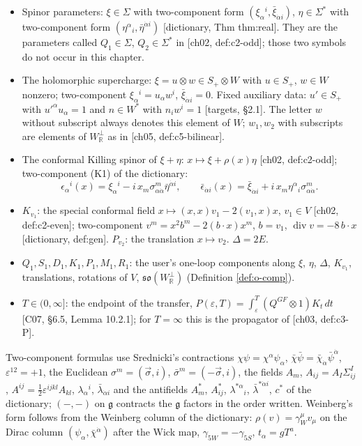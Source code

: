 \begin{definition}
\label{def:o-names}
\begin{itemize}
\item Spinor parameters: $\xi\in\Sigma$ with two-component form $(\xi_\alpha{}^i,\bar\xi_{\dot\alpha i})$, $\eta\in\Sigma^*$ with two-component form $(\eta^\alpha{}_i,\bar\eta^{\dot\alpha i})$ [dictionary, Thm thm:real]. They are the parameters called $Q_1\in\Sigma$, $Q_2\in\Sigma^*$ in [ch02, def:c2-odd]; those two symbols do not occur in this chapter.
\item The holomorphic supercharge: $\xi=u\otimes w\in S_+\otimes W$ with $u\in S_+$, $w\in W$ nonzero; two-component $\xi_\alpha{}^i=u_\alpha w^i$, $\bar\xi_{\dot\alpha i}=0$. Fixed auxiliary data: $u'\in S_+$ with $u'^\alpha u_\alpha=1$ and $n\in W^*$ with $n_iw^i=1$ [targets, §2.1]. The letter $w$ without subscript always denotes this element of $W$; $w_1,w_2$ with subscripts are elements of $W_{\mathbb R}^\perp$ as in [ch05, def:c5-bilinear].
\item The conformal Killing spinor of $\xi+\eta$: $x\mapsto\xi+\rho(x)\eta$ [ch02, def:c2-odd]; two-component (K1) of the dictionary:
\[
\epsilon_\alpha{}^i(x)=\xi_\alpha{}^i-i\,x_m\sigma^m_{\alpha\dot\alpha}\bar\eta^{\dot\alpha i},\qquad \bar\epsilon_{\dot\alpha i}(x)=\bar\xi_{\dot\alpha i}+i\,x_m\eta^\alpha{}_i\sigma^m_{\alpha\dot\alpha}.
\]
\item $K_{v_1}$: the special conformal field $x\mapsto(x,x)v_1-2(v_1,x)x$, $v_1\in V$ [ch02, def:c2-even]; two-component $v^m=x^2b^m-2(b\cdot x)x^m$, $b=v_1$, $\operatorname{div}v=-8\,b\cdot x$ [dictionary, def:gen]. $P_{v_2}$: the translation $x\mapsto v_2$. $\Delta=2E$.
\item $Q_1,S_1,D_1,K_1,P_1,M_1,R_1$: the user's one-loop components along $\xi$, $\eta$, $\Delta$, $K_{v_1}$, translations, rotations of $V$, $\mathfrak{so}(W_{\mathbb R}^\perp)$ (Definition \ref{def:o-comp}).
\item $T\in(0,\infty]$: the endpoint of the transfer, $P(\varepsilon,T)=\int_\varepsilon^T(Q^{GF}\otimes1)K_t\,dt$ [C07, §6.5, Lemma 10.2.1]; for $T=\infty$ this is the propagator of [ch03, def:c3-P].
\end{itemize}
Two-component formulas use Srednicki's contractions $\chi\psi=\chi^\alpha\psi_\alpha$, $\bar\chi\bar\psi=\bar\chi_{\dot\alpha}\bar\psi^{\dot\alpha}$, $\varepsilon^{12}=+1$, the Euclidean $\sigma^m=(\vec\sigma,i)$, $\bar\sigma^m=(-\vec\sigma,i)$, the fields $A_m$, $A_{ij}=A_I\Sigma^I_{ij}$, $A^{ij}=\tfrac12\varepsilon^{ijkl}A_{kl}$, $\lambda_\alpha{}^i$, $\bar\lambda_{\dot\alpha i}$ and the antifields $A^*_m$, $A^*_{ij}$, $\lambda^{*\alpha}{}_i$, $\bar\lambda^{*\dot\alpha i}$, $c^*$ of the dictionary; $(-,-)$ on $\mathfrak g$ contracts the $\mathfrak g$ factors in the order written. Weinberg's form follows from the Weinberg column of the dictionary: $\rho(v)=\gamma_W^\mu v_\mu$ on the Dirac column $(\psi_\alpha,\bar\chi^{\dot\alpha})$ after the Wick map, $\gamma_{5W}=-\gamma_{5S}$, $t_\alpha=gT^a$.
\end{definition}

